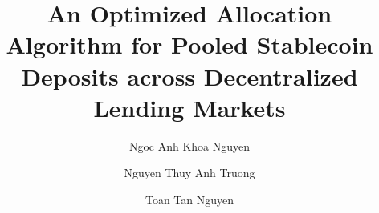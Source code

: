 \documentclass[sigconf]{acmart}
\begin{document}
\title[An Optimized Allocation Algorithm for Decentralized Lending Markets]{An Optimized Allocation Algorithm for Pooled Stablecoin Deposits across Decentralized Lending Markets}

\author{Ngoc Anh Khoa Nguyen}
\author{Nguyen Thuy Anh Truong}
\author{Toan Tan Nguyen}

\renewcommand{\shortauthors}{Nguyen et al.}

\makeatletter
\def\@mkauthors{\begingroup
  \hsize=\textwidth
  \global\setbox\mktitle@bx=\vbox{\noindent
    \unvbox\mktitle@bx\par\medskip\centering
    {\large Ngoc Anh Khoa Nguyen\textsuperscript{1,2},
      Nguyen Thuy Anh Truong\textsuperscript{1,2},
      Toan Tan Nguyen\textsuperscript{1,2}\par}\smallskip
    {\normalsize
      \textsuperscript{1}University of Information Technology, Ho Chi Minh City, Vietnam\par
      \textsuperscript{2}Vietnam National University Ho Chi Minh City, Ho Chi Minh City, Vietnam\par}\smallskip
    {\small \href{mailto:23520750@gm.uit.edu.vn}{23520750@gm.uit.edu.vn},
      \href{mailto:23520082@gm.uit.edu.vn}{23520082@gm.uit.edu.vn},
      \href{mailto:toannt@uit.edu.vn}{toannt@uit.edu.vn}\par}\bigskip}%
  \endgroup}
\makeatother
\end{document}
